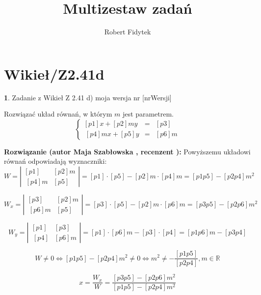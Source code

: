 \documentclass[12pt, a4paper]{article}
\title{Multizestaw zadań}
\author{Robert Fidytek}
\date{}
\theoremstyle{definition} %
\newtheorem{zad}{}
\newcommand{\kategoria}[1]{\section{#1}} %
\newcommand{\zadStart}[1]{\begin{zad}#1\newline} %
\newcommand{\zadStop}{\end{zad}}   %
\newcommand{\rozwStart}[2]{\noindent \textbf{Rozwiązanie (autor #1 , recenzent #2): }\newline} %
\begin{document}
\maketitle


\kategoria{Wikieł/Z2.41d}
\zadStart{Zadanie z Wikieł Z 2.41 d)  moja wersja nr [nrWersji]}

Rozwiązać układ równań, w którym $m$ jest parametrem.
$$\left\{\begin{array}{ccc}
[p1]x+[p2]my&=&[p3]\\
\ [p4]mx+[p5]y&=&[p6]m
\end{array} \right.$$

\zadStop
\rozwStart{Maja Szabłowska}{}
Powyższemu układowi równań odpowiadają wyznaczniki:
$$W=\left| \begin{array}{lccr} [p1] & [p2]m \\ \ [p4]m & [p5] \end{array}\right| = [p1]\cdot[p5] - [p2]m\cdot[p4]m=[p1p5]-[p2p4]m^{2}$$

$$W_{x}=\left| \begin{array}{lccr} [p3] & [p2]m \\ \ [p6]m & [p5] \end{array}\right| = [p3]\cdot[p5] - [p2]m\cdot[p6]m=[p3p5]-[p2p6]m^{2}$$

$$W_{y}=\left| \begin{array}{lccr} [p1] & [p3] \\ \ [p4] & [p6]m \end{array}\right| = [p1]\cdot[p6]m - [p3]\cdot[p4]=[p1p6]m-[p3p4]$$

$$W\neq 0 \iff [p1p5]-[p2p4]m^{2} \neq 0  \iff
m^{2}\neq -\frac{[p1p5]}{[p2p4]}, m\in\mathbb{R} $$

$$x=\frac{W_{x}}{W}=\frac{[p3p5]-[p2p6]m^{2}}{[p1p5]-[p2p4]m^{2}}$$
\end{document}
